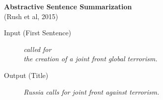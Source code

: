 \documentclass[aspectratio=169,12pt]{beamer}
\newcommand{\air}{\vspace{0.25cm}}
\newcommand{\mair}{\vspace{-0.25cm}}
\begin{document}
\begin{frame}
  \begin{center}
    \textbf{Abstractive Sentence Summarization } \\
\small{ (Rush et al, 2015)}
  \end{center}
    \air

      Input (First Sentence)

  \begin{figure}
    \textit{
      called  for \\ the creation of
      a joint front  global terrorism. }
  \end{figure}

    Output (Title)
  \mair

  \begin{figure}
    \centering
    \textit{\alert{Russia} calls for joint
      front \alert{against} terrorism.}
  \end{figure}

\end{frame}





\end{document}

